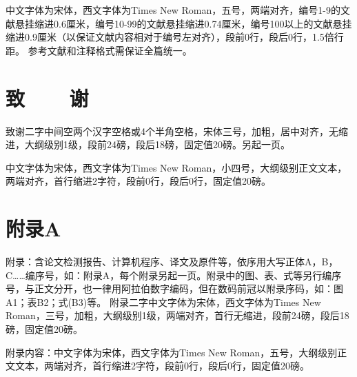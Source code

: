 \documentclass[GBK,UTF8,12pt,oneside,a4paper]{ctexbook}
\begin{document}
中文字体为宋体，西文字体为Times New Roman，五号，两端对齐，编号1-9的文献悬挂缩进0.6厘米，编号10-99的文献悬挂缩进0.74厘米，编号100以上的文献悬挂缩进0.9厘米（以保证文献内容相对于编号左对齐），段前0行，段后0行，1.5倍行距。
参考文献和注释格式需保证全篇统一。

\chapter*{致~~~~谢}
{}
致谢二字中间空两个汉字空格或4个半角空格，宋体三号，加粗，居中对齐，无缩进，大纲级别1级，段前24磅，段后18磅，固定值20磅。另起一页。

中文字体为宋体，西文字体为Times New Roman，小四号，大纲级别正文文本，两端对齐，首行缩进2字符，段前0行，段后0行，固定值20磅。
\chapter*{附录A}
{}
附录：含论文检测报告、计算机程序、译文及原件等，依序用大写正体A，B，C……编序号，如：附录A，每个附录另起一页。附录中的图、表、式等另行编序号，与正文分开，也一律用阿拉伯数字编码，但在数码前冠以附录序码，如：图A1；表B2；式(B3)等。
附录二字中文字体为宋体，西文字体为Times New Roman，三号，加粗，大纲级别1级，两端对齐，首行无缩进，段前24磅，段后18磅，固定值20磅。

附录内容：中文字体为宋体，西文字体为Times New Roman，五号，大纲级别正文文本，两端对齐，首行缩进2字符，段前0行，段后0行，固定值20磅。

\end{document}
